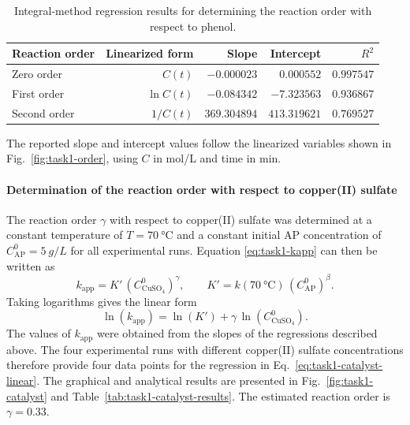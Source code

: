 \begin{table}[htbp]
  \centering
  \caption{Integral-method regression results for determining the reaction
  order with respect to phenol.}
  \label{tab:task1-phenol-order}
  \small
  \begin{tabular}{lrrrr}
    \toprule
    Reaction order & Linearized form & Slope & Intercept & \(R^2\) \\
    \midrule
    Zero order  & \(C(t)\)    & \(-0.000023\) & \(0.000552\) & \(0.997547\) \\
    First order & \(\ln C(t)\) & \(-0.084342\) & \(-7.323563\) & \(0.936867\) \\
    Second order & \(1/C(t)\) & \(369.304894\) & \(413.319621\) & \(0.769527\) \\
    \bottomrule
  \end{tabular}
\end{table}
The reported slope and intercept values follow the linearized variables
shown in Fig.~\ref{fig:task1-order}, using \(C\) in \si{mol/L} and time in
\si{min}.

\paragraph{Determination of the reaction order with respect to copper(II) sulfate}
The reaction order \(\gamma\) with respect to copper(II) sulfate was
determined at a constant temperature of \(T=\SI{70}{\degreeCelsius}\) and a
constant initial AP concentration of
\(C_{\mathrm{AP}}^{0}=\SI{5}{g/L}\) for all experimental runs. Equation
\eqref{eq:task1-kapp} can then be written as
\begin{equation}
  k_{\mathrm{app}} = K'\,(C_{\mathrm{CuSO_4}}^{0})^{\gamma},
  \qquad
  K' = k(\SI{70}{\degreeCelsius})\,(C_{\mathrm{AP}}^{0})^{\beta}.
  \label{eq:task1-catalyst-kapp}
\end{equation}
Taking logarithms gives the linear form
\begin{equation}
  \ln(k_{\mathrm{app}})
    = \ln(K') + \gamma\,\ln(C_{\mathrm{CuSO_4}}^{0}).
  \label{eq:task1-catalyst-linear}
\end{equation}
The values of \(k_{\mathrm{app}}\) were obtained from the slopes of the
regressions described above. The four experimental runs with different
copper(II) sulfate concentrations therefore provide four data points for the
regression in Eq.~\eqref{eq:task1-catalyst-linear}. The graphical and
analytical results are presented in Fig.~\ref{fig:task1-catalyst} and
Table~\ref{tab:task1-catalyst-results}. The estimated reaction order is
\(\gamma=0.33\).

